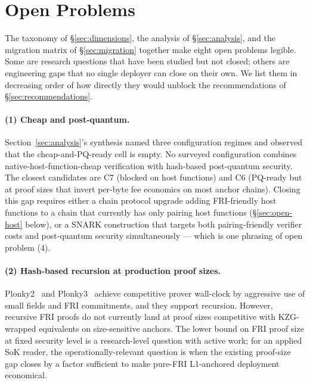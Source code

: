 \section{Open Problems}
\label{sec:open}

The taxonomy of \S\ref{sec:dimensions}, the analysis of
\S\ref{sec:analysis}, and the migration matrix of
\S\ref{sec:migration} together make eight open problems legible. Some
are research questions that have been studied but not closed; others
are engineering gaps that no single deployer can close on their own.
We list them in decreasing order of how directly they would
unblock the recommendations of \S\ref{sec:recommendations}.

\paragraph{(1) Cheap and post-quantum.} Section~\ref{sec:analysis}'s
synthesis named three configuration regimes and observed that the
cheap-and-PQ-ready cell is empty. No surveyed configuration combines
native-host-function-cheap verification with hash-based
post-quantum security. The closest candidates are C7 (blocked on
host functions) and C6 (PQ-ready but at proof sizes that invert
per-byte fee economics on most anchor chains). Closing this gap
requires either a chain protocol upgrade adding FRI-friendly host
functions to a chain that currently has only pairing host functions
(\S\ref{sec:open-host} below), or a SNARK construction that targets
both pairing-friendly verifier costs and post-quantum security
simultaneously --- which is one phrasing of open problem (4).

\paragraph{(2) Hash-based recursion at production proof
sizes.} Plonky2~\cite{plonky2-2022} and
Plonky3~\cite{plonky3-spec} achieve competitive prover wall-clock by
aggressive use of small fields and FRI commitments, and they support
recursion. However, recursive FRI proofs do not currently land at
proof sizes competitive with KZG-wrapped equivalents on
size-sensitive anchors. The lower bound on FRI proof size at fixed
security level is a research-level question with active
work; for an applied SoK reader, the operationally-relevant
question is when the existing proof-size gap closes by a factor
sufficient to make pure-FRI L1-anchored deployment economical.

